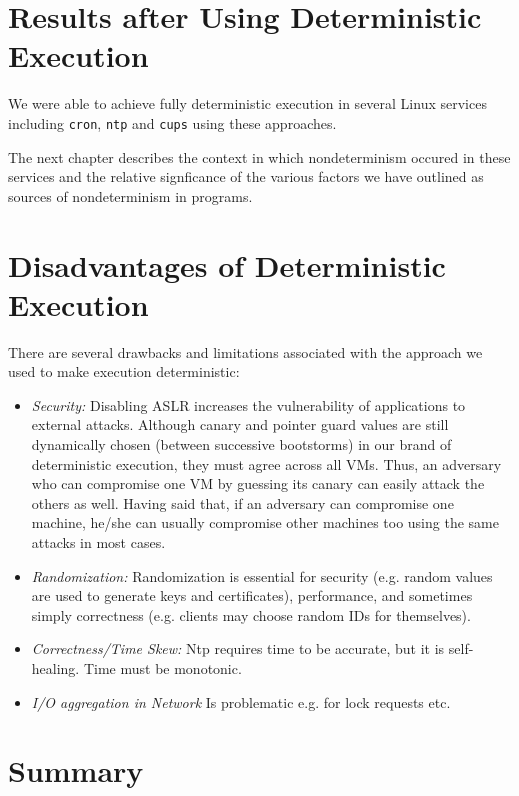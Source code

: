 \section{Results after Using Deterministic Execution} \label{ch3:data}
We were able to achieve fully deterministic execution in several
Linux services including \texttt{cron}, \texttt{ntp} and
\texttt{cups} using these approaches.

The next chapter describes the context in which nondeterminism
occured in these services and the relative signficance of the various factors we have outlined 
as sources of nondeterminism in programs.

\section{Disadvantages of Deterministic Execution} \label{ch3:issues}
There are several drawbacks and limitations associated with the approach we used
to make execution deterministic:
\begin{itemize}
\item {\em Security:} \newline
Disabling ASLR increases the vulnerability of
applications to external attacks. 
Although canary and pointer guard
values are still dynamically chosen (between successive bootstorms) in
our brand of deterministic execution, 
they must agree across all VMs. Thus,
an adversary  who can compromise one VM by guessing its canary can easily
attack the others as well. 
Having said that, if an adversary can compromise one machine, he/she can usually compromise
other machines too using the same attacks in most cases.

\item {\em Randomization:} \newline
Randomization is essential for security (e.g. random values
are used to generate keys and certificates),
performance, and sometimes simply correctness (e.g. 
clients may choose random IDs for themselves). 
\item{\em Correctness/Time Skew:} \newline
Ntp requires time to be accurate, but it is self-healing.
Time must be monotonic.
\item{\em I/O aggregation in Network} \newline
Is problematic e.g. for lock requests etc.

\end{itemize}

\section {Summary}
